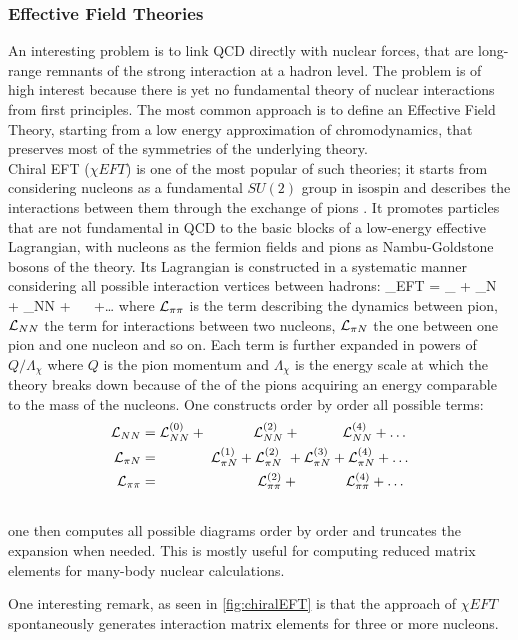 \subsubsection{Effective Field Theories}
An interesting problem is to link QCD directly with nuclear forces, that are long-range remnants of the strong interaction at a hadron level. The problem is of high interest because there is yet no fundamental theory of nuclear interactions from first principles. The most common approach is to define an Effective Field Theory, starting from a low energy approximation of chromodynamics, that preserves most of the symmetries of the underlying theory. \\
Chiral EFT ($\chi EFT$) is one of the most popular of such theories; it starts from considering nucleons as a fundamental $SU(2)$ group in isospin and describes the interactions between them through the exchange of pions \cite{machleidt_chiral_2016}. It promotes particles that are not fundamental in QCD to the basic blocks of a low-energy effective Lagrangian, with nucleons as the fermion fields and pions as Nambu-Goldstone bosons of the theory. Its Lagrangian is constructed in a systematic manner considering all possible interaction vertices between hadrons:
\beq
    \Lagr_{\chi EFT} = \Lagr_{\pi\pi} +  \Lagr_{\pi N} + \Lagr_{NN} + ~ ~+\dots
\eeq 
where $\mathcal{L}_{\pi\pi}$ is the term describing the dynamics between pion, $\mathcal{L}_{NN}$ the term for interactions between two nucleons, $\mathcal{L}_{\pi N}$ the one between one pion and one nucleon and so on. Each term is further expanded in powers of $Q/\Lambda_\chi$ where $Q$ is the pion momentum and $\Lambda_\chi$ is the energy scale at which the theory breaks down because of the of the pions acquiring an energy comparable to the mass of the nucleons. One constructs order by order all possible terms:
\begin{align}
    \mathcal{L}_{NN} &= \mathcal{L}_{NN}^{(0)} + ~~~~~~~~~~  \mathcal{L}_{NN}^{(2)} + ~~~~~~~~~  \mathcal{L}_{NN}^{(4)} + \dots\\\nonumber
    \mathcal{L}_{\pi N} &= ~~~~~~~~~~~ \mathcal{L}_{\pi N}^{(1)} + \mathcal{L}_{\pi N}^{(2)} ~+  \mathcal{L}_{\pi N}^{(3)} + \mathcal{L}_{\pi N}^{(4)} + \dots  \\\nonumber
    \mathcal{L}_{\pi \pi} &= ~~~~~~~~~~~~~~~~~~~~~ \mathcal{L}_{\pi \pi}^{(2)} +  ~~~~~~~~~~  \mathcal{L}_{\pi \pi}^{(4)} + \dots  \\\nonumber
\end{align} 
one then computes all possible diagrams order by order and truncates the expansion when needed. This is mostly useful for computing reduced matrix elements for many-body nuclear calculations. 

One interesting remark, as seen in \cref{fig:chiralEFT} is that the approach of $\chi EFT$ spontaneously generates interaction matrix elements for three or more nucleons. 